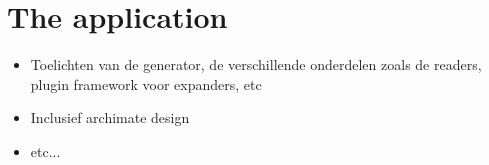 \section{The application} \label{sec_artifact_application}

\begin{itemize}
    \item Toelichten van de generator, de verschillende onderdelen zoals de readers,
    plugin framework voor expanders, etc
    \item Inclusief archimate design
    \item etc...
\end{itemize}